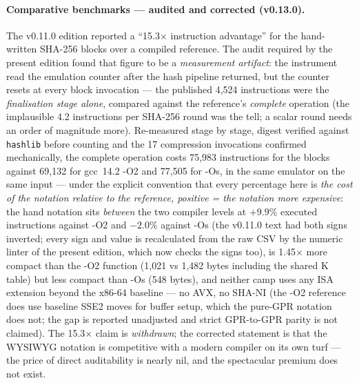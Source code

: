 \documentclass[10pt,a4paper]{article}
\newcommand{\code}[1]{\texttt{\small #1}}
\begin{document}
\paragraph{Comparative benchmarks --- audited and corrected (v0.13.0).} The
v0.11.0 edition reported a ``15.3$\times$ instruction advantage'' for
the hand-written SHA-256 blocks over a compiled reference. The audit
required by the present edition found that figure to be a \emph{measurement
artifact}: the instrument read the emulation counter after the hash
pipeline returned, but the counter resets at every block invocation ---
the published 4{,}524 instructions were the \emph{finalisation stage
alone}, compared against the reference's \emph{complete} operation (the
implausible 4.2 instructions per SHA-256 round was the tell; a scalar
round needs an order of magnitude more). Re-measured stage by stage,
digest verified against \code{hashlib} before counting and the 17
compression invocations confirmed mechanically, the complete operation
costs 75{,}983 instructions for the blocks against 69{,}132 for
gcc~14.2 -O2 and 77{,}505 for -Os, in the same emulator on the same
input --- under the explicit convention that every percentage here is
\emph{the cost of the notation relative to the reference, positive =
the notation more expensive}: the hand notation sits \emph{between}
the two compiler levels at $+9.9\%$ executed instructions against -O2
and $-2.0\%$ against -Os (the v0.11.0 text had both signs inverted;
every sign and value is recalculated from the raw CSV by the numeric
linter of the present edition, which now checks the signs too), is
1.45$\times$ more compact than the -O2 function (1{,}021 vs 1{,}482
bytes including the shared K table) but less compact than -Os (548
bytes), and neither camp uses any ISA extension beyond the x86-64
baseline --- no AVX, no SHA-NI (the -O2 reference does use baseline SSE2
moves for buffer setup, which the pure-GPR notation does not; the gap
is reported unadjusted and strict GPR-to-GPR parity is not claimed).
The 15.3$\times$ claim is \emph{withdrawn}; the corrected statement is
that the WYSIWYG notation is competitive with a modern compiler on its
own turf --- the price of direct auditability is nearly nil, and the
spectacular premium does not exist.
\end{document}
